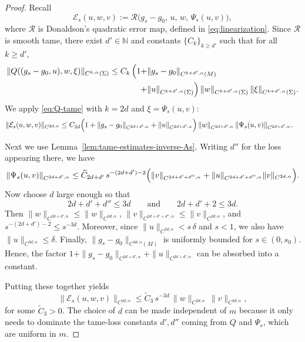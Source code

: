 \documentclass[10pt,a4paper]{amsart}
\newcommand{\N}{\mathbb{N}}
\begin{document}
\begin{proof}
	Recall
	\[
	\mathcal{E}_{s}(u,w,v):=\mathcal{R}\bigl(g_{s}-g_0,\,u,\,w,\,\Psi_{s}(u,v)\bigr),
	\]
	where $\mathcal{R}$ is Donaldson's quadratic error map, defined in \eqref{eq:linearization}.
	Since $\mathcal{R}$ is smooth tame, there exist $d'\in\N$ and constants $\{C_k\}_{k\ge d'}$
	such that for all $k\ge d'$,
	\begin{align}\label{eq:Q-tame}
		\|Q((g_s-g_0,u),w,\xi)\|_{C^{k,\alpha}(\Sigma)}
		\le C_k\,\Bigl(1+&\|g_s-g_0\|_{C^{k+d',\alpha}(M)}
		\\+&\|u\|_{C^{k+d',\alpha}(\Sigma)}\Bigr)\,
		\|w\|_{C^{k+d',\alpha}(\Sigma)}\,\|\xi\|_{C^{k+d',\alpha}(\Sigma)} . \notag
	\end{align}
	We apply \eqref{eq:Q-tame} with $k=2d$ and $\xi=\Psi_s(u,v)$:
	\begin{align*}
		\|\mathcal E_s(u,w,v)\|_{C^{2d,\alpha}}
		\le {}& C_{2d}\Bigl(1+\|g_s-g_0\|_{C^{2d+d',\alpha}}+\|u\|_{C^{2d+d',\alpha}}\Bigr)\,
		\|w\|_{C^{2d+d',\alpha}}\,
		\|\Psi_s(u,v)\|_{C^{2d+d',\alpha}} .
	\end{align*}
	
	Next we use Lemma~\ref{lem:tame-estimates-inverse-As}. Writing $d''$ for the loss
	appearing there, we have
	\begin{align*}
		\|\Psi_s(u,v)\|_{C^{2d+d',\alpha}}
		\le \widetilde C_{2d+d'}\, s^{-(2d+d')-2}\Bigl(
		\|v\|_{C^{2d+d'+d'',\alpha}}
		+\|u\|_{C^{2d+d'+d'',\alpha}}\|v\|_{C^{2d,\alpha}}
		\Bigr).
	\end{align*}
	Now choose $d$ large enough so that
	\[
	2d+d'+d''\le 3d
	\qquad\text{and}\qquad
	2d+d'+2\le 3d .
	\]
	Then $\|w\|_{C^{2d+d',\alpha}}\le \|w\|_{C^{3d,\alpha}}$,
	$\|v\|_{C^{2d+d'+d'',\alpha}}\le \|v\|_{C^{3d,\alpha}}$, and
	$s^{-(2d+d')-2}\le s^{-3d}$.
	Moreover, since $\|u\|_{C^{3d,\alpha}}<s\,\delta$ and $s<1$, we also have
	$\|u\|_{C^{3d,\alpha}}\le \delta$.
	Finally, $\|g_s-g_0\|_{C^{3d,\alpha}(M)}$ is uniformly bounded for $s\in(0,s_0)$.  
	Hence, the factor
	$1+\|g_s-g_0\|_{C^{2d+d',\alpha}}+\|u\|_{C^{2d+d',\alpha}}$
	can be absorbed into a constant.
	
	Putting these together yields
	\[
	\|\mathcal E_s(u,w,v)\|_{C^{2d,\alpha}}
	\le \widetilde C_3\, s^{-3d}\,
	\|w\|_{C^{3d,\alpha}}\,\|v\|_{C^{3d,\alpha}},
	\]
	for some $\widetilde C_3>0$.
	The choice of $d$ can be made independent of $m$ because it only needs to dominate
	the tame-loss constants $d',d''$ coming from $Q$ and $\Psi_s$, which are uniform in $m$.
\end{proof}
\end{document}
